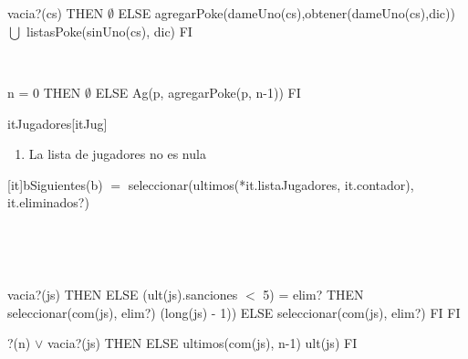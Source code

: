 \begin{Representacion}
	~

		 
	~

	{\IF vacia?(cs) THEN
		$\emptyset$
	ELSE
		agregarPoke(dameUno(cs),obtener(dameUno(cs),dic)) $\bigcup$ listasPoke(sinUno(cs), dic)
	FI}
		
	~

	{\IF n = 0 THEN
		$\emptyset$
	ELSE
		Ag(p, agregarPoke(p, n-1))
	FI}



	\begin{Estructura}{itJugadores}[itJug]
		\begin{Tupla}[itJug]
		\end{Tupla}
	\end{Estructura}


	\begin{enumerate}

		\item La lista de jugadores no es nula

	\end{enumerate}




	[it]{b}{Siguientes(b) $=$ seleccionar(ultimos(*it.listaJugadores, it.contador), it.eliminados?)}

	~



	~

	{\IF vacia?(js) THEN
		\secuvacia
	ELSE
		{\IF (ult(js).sanciones $<$ 5) = elim? THEN  seleccionar(com(js), elim?) \circulito (long(js) - 1)) ELSE seleccionar(com(js), elim?) FI}
	FI}

	{?(n) $\lor$ vacia?(js) THEN
		\secuvacia
	ELSE
		ultimos(com(js), n-1) \circulito ult(js)
	FI}
\end{Representacion}


